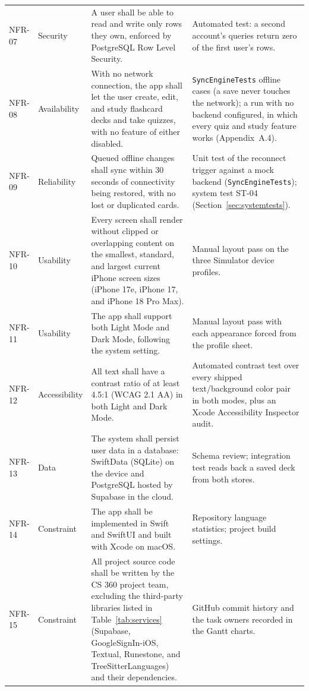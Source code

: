 \documentclass[12pt,letterpaper]{article}
\begin{document}
\begin{xltabular}{\textwidth}{@{}l L{2.1cm} Y L{4.3cm}@{}}
NFR-07 & Security & A user shall be able to read and write only rows they own, enforced by PostgreSQL Row Level Security. & Automated test: a second account's queries return zero of the first user's rows. \\
NFR-08 & Availability & With no network connection, the app shall let the user create, edit, and study flashcard decks and take quizzes, with no feature of either disabled. & \texttt{SyncEngineTests} offline cases (a save never touches the network); a run with no backend configured, in which every quiz and study feature works (Appendix~A.4). \\
NFR-09 & Reliability & Queued offline changes shall sync within 30 seconds of connectivity being restored, with no lost or duplicated cards. & Unit test of the reconnect trigger against a mock backend (\texttt{SyncEngineTests}); system test ST-04 (Section~\ref{sec:systemtests}). \\
NFR-10 & Usability & Every screen shall render without clipped or overlapping content on the smallest, standard, and largest current iPhone screen sizes (iPhone 17e, iPhone 17, and iPhone 18 Pro Max). & Manual layout pass on the three Simulator device profiles. \\
NFR-11 & Usability & The app shall support both Light Mode and Dark Mode, following the system setting. & Manual layout pass with each appearance forced from the profile sheet. \\
NFR-12 & Accessibility & All text shall have a contrast ratio of at least 4.5:1 (WCAG 2.1 AA) in both Light and Dark Mode. & Automated contrast test over every shipped text/background color pair in both modes, plus an Xcode Accessibility Inspector audit. \\
NFR-13 & Data & The system shall persist user data in a database: SwiftData (SQLite) on the device and PostgreSQL hosted by Supabase in the cloud. & Schema review; integration test reads back a saved deck from both stores. \\
NFR-14 & Constraint & The app shall be implemented in Swift and SwiftUI and built with Xcode on macOS. & Repository language statistics; project build settings. \\
NFR-15 & Constraint & All project source code shall be written by the CS 360 project team, excluding the third-party libraries listed in Table~\ref{tab:services} (Supabase, GoogleSignIn-iOS, Textual, Runestone, and TreeSitterLanguages) and their dependencies. & GitHub commit history and the task owners recorded in the Gantt charts. \\

\end{xltabular}
\end{document}
